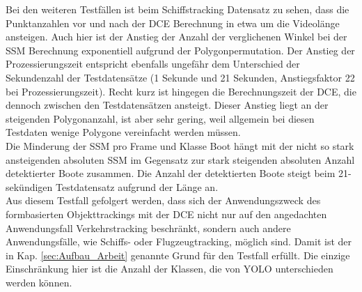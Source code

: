 {{		Bei den weiteren Testfällen ist beim Schiffstracking Datensatz zu sehen, dass die Punktanzahlen vor und nach der DCE Berechnung in etwa um die Videolänge ansteigen. Auch hier ist der Anstieg der Anzahl der verglichenen Winkel bei der SSM Berechnung exponentiell aufgrund der Polygonpermutation. Der Anstieg der Prozessierungszeit entspricht ebenfalls ungefähr dem Unterschied der Sekundenzahl der Testdatensätze (1 Sekunde und 21 Sekunden, Anstiegsfaktor 22 bei Prozessierungszeit). Recht kurz ist hingegen die Berechnungszeit der DCE, die dennoch zwischen den Testdatensätzen ansteigt. Dieser Anstieg liegt an der steigenden Polygonanzahl, ist aber sehr gering, weil allgemein bei diesen Testdaten wenige Polygone vereinfacht werden müssen. \\
		Die Minderung der SSM pro Frame und Klasse Boot hängt mit der nicht so stark ansteigenden absoluten SSM im Gegensatz zur stark steigenden absoluten Anzahl detektierter Boote  zusammen. Die Anzahl der detektierten Boote steigt beim 21-sekündigen Testdatensatz aufgrund der Länge an.\\
		Aus diesem Testfall gefolgert werden, dass sich der Anwendungszweck des formbasierten Objekttrackings mit der DCE nicht nur auf den angedachten Anwendungsfall Verkehrstracking beschränkt, sondern auch andere Anwendungsfälle, wie Schiffs- oder Flugzeugtracking, möglich sind. Damit ist der in Kap. \ref{sec:Aufbau_Arbeit} genannte Grund für den Testfall erfüllt. Die einzige Einschränkung hier ist die Anzahl der Klassen, die von YOLO unterschieden werden können.\\

}}
